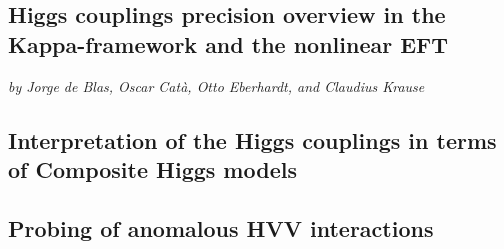 \documentclass[../report.tex]{subfiles}
\providecommand{\main}{..}
\begin{document}
%
 
\subsection{Higgs couplings precision overview in the Kappa-framework and the nonlinear EFT}\label{sec2:theo_kappa_EFT}
\begin{center}{\it by Jorge de Blas, Oscar Cat\`a, Otto Eberhardt, and Claudius Krause} \end{center}


%

\subsection{Interpretation of the Higgs couplings in terms of Composite Higgs models}


\subsection[Probing of anomalous HVV interactions]{Probing of anomalous HVV interactions}
\label{sec2:anomalous_HVV}



\clearpage

\end{document}

